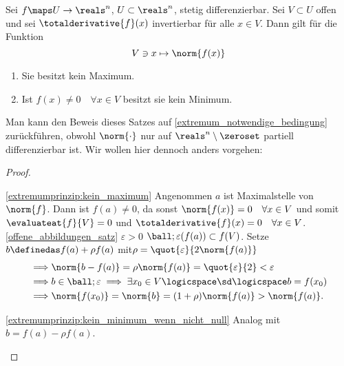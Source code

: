\begin{satz}\label{extremumprinzip}
  Sei \( f\maps U\to \reals^n \), \( U\subset \reals^n \), stetig differenzierbar. Sei \( V\subset U \) offen und sei \( \totalderivative{f}(x) \) invertierbar für alle \( x\in V \). Dann gilt für die Funktion
  \begin{equation*}
    V\ni x\mapsto \norm{f(x)}
  \end{equation*}
  \begin{enumerate}
    \item \label{extremumprinzip:kein_maximum} Sie besitzt kein Maximum.
    \item \label{extremumprinzip:kein_minimum_wenn_nicht_null} Ist \( f(x)\neq 0\quad \forall x\in V \) besitzt sie kein Minimum.
  \end{enumerate}
\end{satz}
\begin{beachte*}
  Man kann den Beweis dieses Satzes auf \ref{extremum_notwendige_bedingung} zurückführen, obwohl \( \norm{\cdot} \) nur auf \( \reals^n\setminus \zeroset  \) partiell differenzierbar ist. Wir wollen hier dennoch anders vorgehen:
\end{beachte*}
\begin{proof}
  \begin{proofdescription}
    \item[\ref{extremumprinzip:kein_maximum}] Angenommen \( a \) ist Maximalstelle von \( \norm{f} \). Dann ist \( f(a)\neq 0 \), da sonst \( \norm{f(x)}=0\quad \forall x\in V \) und somit \( \evaluateat{f}{V}=0 \) und \( \totalderivative{f}(x)=0\quad \forall x\in V \). \ref{offene_abbildungen_satz} \timplies \texists  \( \varepsilon>0 \) \sd \( \ball;{\varepsilon}(f(a))\subset f(V) \). Setze \( b\definedas f(a)+\rho f(a) \) mit\( \rho=\quot{\varepsilon}{2\norm{f(a)}} \) 
    \begin{align*}
      \implies &\norm{b-f(a)}=\rho\norm{f(a)}=\quot{\varepsilon}{2}<\varepsilon\\
      \implies &b\in \ball;{\varepsilon}\implies \exists x_0\in V  \logicspace \text{\sd}\logicspace b=f(x_0)\\
      \implies &\norm{f(x_0)}=\norm{b}=(1+\rho)\norm{f(a)}>\norm{f(a)}.
    \end{align*}
    \item[\ref{extremumprinzip:kein_minimum_wenn_nicht_null}] Analog mit \( b=f(a)-\rho f(a) \).
  \end{proofdescription}
  
\end{proof}
